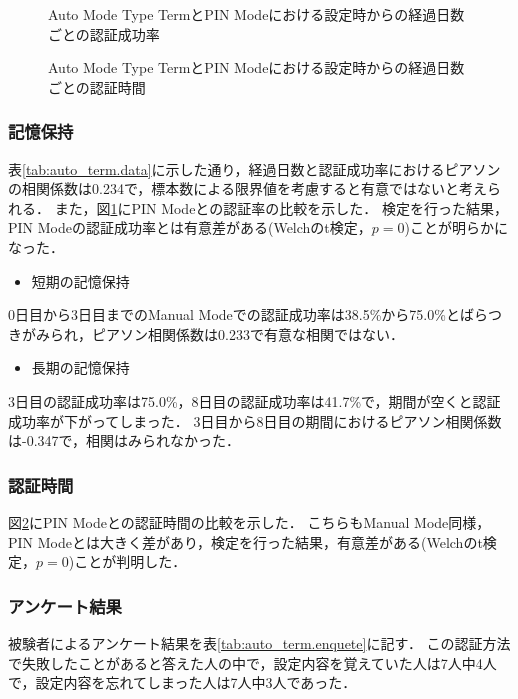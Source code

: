 \begin{figure}[ht]
  \begin{center}
  \end{center}
  \caption{Auto Mode Type TermとPIN Modeにおける設定時からの経過日数ごとの認証成功率}
  \label{fig:ex_auto_term_vs_pin_rate}
\end{figure}

\begin{figure}[hb]
  \begin{center}
  \end{center}
  \caption{Auto Mode Type TermとPIN Modeにおける設定時からの経過日数ごとの認証時間}
  \label{fig:ex_auto_term_vs_pin_time}
\end{figure}

\subsubsection{記憶保持}
表\ref{tab:auto_term.data}に示した通り，経過日数と認証成功率におけるピアソンの相関係数は0.234で，標本数による限界値を考慮すると有意ではないと考えられる．
また，図\ref{fig:ex_auto_term_vs_pin_rate}にPIN Modeとの認証率の比較を示した．
検定を行った結果，PIN Modeの認証成功率とは有意差がある(Welchのt検定，$ p = 0 $)ことが明らかになった．
\begin{itemize}
  \item 短期の記憶保持
\end{itemize}
0日目から3日目までのManual Modeでの認証成功率は38.5\%から75.0\%とばらつきがみられ，ピアソン相関係数は0.233で有意な相関ではない．

\begin{itemize}
  \item 長期の記憶保持
\end{itemize}
3日目の認証成功率は75.0\%，8日目の認証成功率は41.7\%で，期間が空くと認証成功率が下がってしまった．
3日目から8日目の期間におけるピアソン相関係数は-0.347で，相関はみられなかった．

\subsubsection{認証時間}
図\ref{fig:ex_auto_term_vs_pin_time}にPIN Modeとの認証時間の比較を示した．
こちらもManual Mode同様，PIN Modeとは大きく差があり，検定を行った結果，有意差がある(Welchのt検定，$ p = 0 $)ことが判明した．

\subsubsection{アンケート結果}
被験者によるアンケート結果を表\ref{tab:auto_term.enquete}に記す．
この認証方法で失敗したことがあると答えた人の中で，設定内容を覚えていた人は7人中4人で，設定内容を忘れてしまった人は7人中3人であった．


